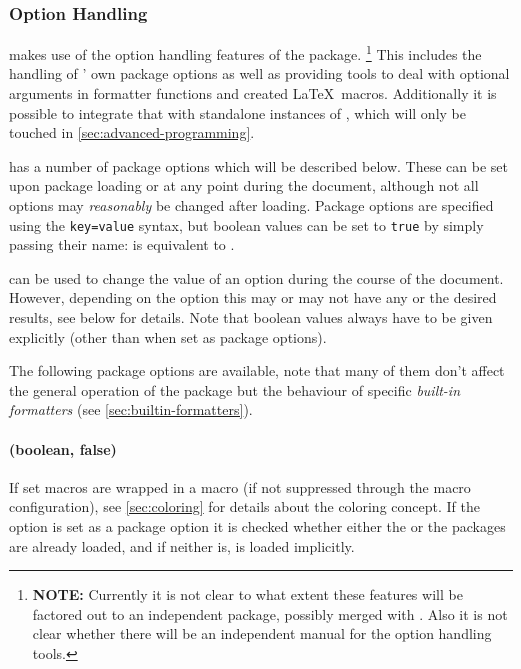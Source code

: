 \documentclass{scrartcl}
\begin{document}
\subsubsection{Option Handling}
\label{sec:option-handling}

 makes use of the option handling features of the
 package.%
\footnote{\textbf{NOTE:} Currently it is not clear to what extent these features will
be factored out to an independent package, possibly merged with .
Also it is not clear whether there will be an independent manual for the option handling
tools.} %
This includes the handling of ' own package options as
well as providing tools to deal with optional arguments in formatter functions
and created \LaTeX\ macros.  Additionally it is possible to integrate that with
standalone instances of , which will only be touched in
\vref{sec:advanced-programming}.

 has a number of package options which will be described
below.  These can be set upon package loading or at any point during the
document, although not all options may \emph{reasonably} be changed after
loading.  Package options are specified using the \texttt{key=value} syntax, but
boolean values can be set to \texttt{true} by simply passing their name:
\luavar{[color]} is equivalent to \luavar{[color=true]}.

 can be used to change the value of
an option during the course of the document.  However, depending on the option
this may or may not have any or the desired results, see below for details.
Note that boolean values always have to be given explicitly (other than when set
as package options).

The following package options are available, note that many of them don't affect
the general operation of the package but the behaviour of specific
\emph{built-in formatters} (see \vref{sec:builtin-formatters}).


\paragraph{ (boolean, false)}

If set macros are wrapped in a  macro (if not suppressed through
the macro configuration),  see \vref{sec:coloring} for details about the
coloring concept.  If the option is set as a package option it is checked
whether either the  or the  packages are already
loaded, and if neither is,  is loaded implicitly.
\end{document}

